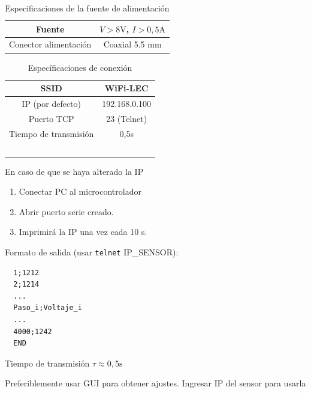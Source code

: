 \documentclass[12pt,a4paper]{article}
\begin{document}
\begin{table}[H]
  \centering
  \begin{tabular}{|c|c|}
    \hline
    Fuente &  $V > 8\text{V}$, $I>0,5\text{A}$ \\ \hline
    Conector alimentación &  Coaxial 5.5 mm \\ \hline
  \end{tabular}
  \caption{Especificaciones de la fuente de alimentación}
  \label{tab:electronica_tcp}
\end{table}


\begin{table}[H]
  \centering
  \begin{tabular}{|c|c|}
    \hline
    SSID &  WiFi-LEC \\ \hline
    IP (por defecto) &  192.168.0.100 \\ \hline
    Puerto TCP & 23 (Telnet) \\ \hline
    Tiempo de transmisión & 0,5s \\ \hline
  \end{tabular}
  \caption{Específicaciones de conexión}
  \label{tab:electronica_tcp}
\end{table}

En caso de que se haya alterado la IP
\begin{enumerate}
  \item Conectar PC al microcontrolador
  \item Abrir puerto serie creado.
  \item Imprimirá la IP una vez cada 10 s.
\end{enumerate}

\noindent Formato de salida (usar \texttt{telnet} IP\_SENSOR):

\begin{verbatim}
  1;1212
  2;1214
  ...
  Paso_i;Voltaje_i
  ...
  4000;1242
  END
\end{verbatim}

Tiempo de transmisión $\tau \approx 0,5\text{s}$

Preferiblemente usar GUI para obtener ajustes. Ingresar IP del sensor para usarla


\clearpage
\end{document}
